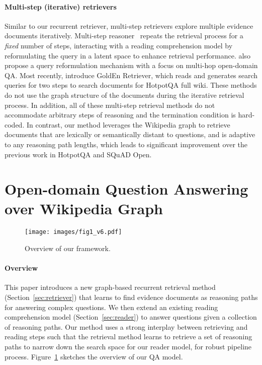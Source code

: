 \vspace{-2mm}
\paragraph{Multi-step (iterative) retrievers}
Similar to our recurrent retriever, multi-step retrievers explore multiple evidence documents iteratively. 
Multi-step reasoner~\citep{das2019multi} repeats the retrieval process for a {\it fixed} number of steps, interacting with a reading comprehension model by reformulating the query in a latent space to enhance retrieval performance.
\cite{muppet2019multihop} also propose a query reformulation mechanism with a focus on multi-hop open-domain QA.
Most recently, \cite{qi2019answering} introduce GoldEn Retriever, which reads and generates search queries for two steps to search documents for HotpotQA full wiki. 
These methods do not use the graph structure of the documents during the iterative retrieval process.
In addition, all of these multi-step retrieval methods do not accommodate arbitrary steps of reasoning and the termination condition is hard-coded. In contrast, our method leverages the Wikipedia graph to retrieve documents that are lexically or semantically distant to questions, and is adaptive to any reasoning path lengths, which leads to significant improvement over the previous work in HotpotQA and SQuAD Open. 

\section{Open-domain Question Answering over Wikipedia Graph}
\begin{figure}[t!]
  \centering
  \texttt{[image: images/fig1\_v6.pdf]}
  \caption{Overview of our framework. }
  \label{figure:overview}
\end{figure}

\vspace{-2mm}
\paragraph{Overview}
This paper introduces a new graph-based recurrent retrieval method (Section~\ref{sec:retriever}) that learns to find evidence documents as reasoning paths for answering complex questions.
We then extend an existing reading comprehension model (Section~\ref{sec:reader}) to answer questions given a collection of reasoning paths. 
Our method uses a strong interplay between retrieving and reading steps such that the retrieval method learns to retrieve a set of reasoning paths to narrow down the search space for our reader model, for robust pipeline process.
Figure~\ref{figure:overview} sketches the overview of our QA model. 

